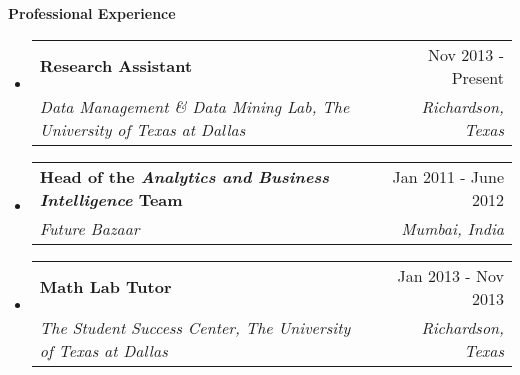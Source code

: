 \documentclass[letterpaper,11pt]{article}
\makeatletter
\newcommand{\resitem}[1]{\item[\ding{226}] #1 \vspace{-2pt}}
\newcommand{\resheading}[1]{{\large \colorbox{mygrey}{\begin{minipage}{\textwidth}{\textbf{#1 \vphantom{p\^{E}}}}\end{minipage}}}}
\newcommand{\ressubheading}[4]{
\begin{tabular*}{7.0in}{l@{\extracolsep{\fill}}r}
		\textbf{#1} & #2 \\
		\textit{#3} & \textit{#4} \\
\end{tabular*}\vspace{-6pt}}
\newcommand{\reslineheading}[2]{
\begin{tabular*}{7.0in}{l@{\extracolsep{\fill}}r}
		\textbf{#1} & #2 \\
\end{tabular*}\vspace{-6pt}}
\makeatother
\begin{document}
\begin{itemize}

%
%

\end{itemize}

\resheading{Professional Experience}
\begin{itemize}
\item
	\ressubheading{Research Assistant}{Nov 2013 - Present}{Data Management \& Data Mining Lab, The University of Texas at Dallas}{Richardson, Texas}

\item
	\ressubheading{Head of the \textit{Analytics and Business Intelligence} Team}{Jan 2011 - June 2012}{Future Bazaar}{Mumbai, India}

\item
	\ressubheading{Math Lab Tutor}{Jan 2013 - Nov 2013}{The Student Success Center, The University of Texas at Dallas}{Richardson, Texas} 

\end{itemize}
\end{document}
